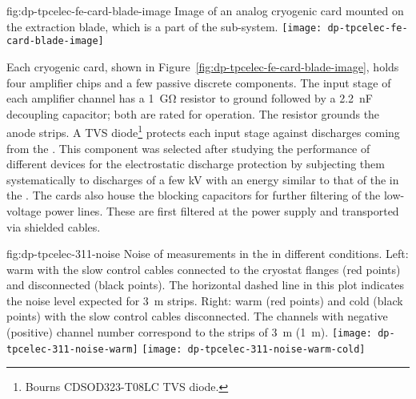 \begin{dunefigure}{fig:dp-tpcelec-fe-card-blade-image}
{Image of an analog cryogenic  card mounted on the extraction blade, which is a part of the  sub-system.}
\texttt{[image: dp-tpcelec-fe-card-blade-image]}
\end{dunefigure}

Each cryogenic  card, shown in Figure~\ref{fig:dp-tpcelec-fe-card-blade-image}, %
holds four  amplifier chips and a few passive discrete components. The input stage of each amplifier channel has a \SI{1}{\giga\ohm} resistor to ground followed by a \SI{2.2}{\nano\farad} decoupling capacitor; both are rated for  operation. The %
resistor grounds the  anode strips. A TVS diode\footnote{Bourns\texttrademark{} CDSOD323-T08LC TVS diode.} protects each input stage against discharges coming from the . This component was selected after studying the performance of different devices for the electrostatic discharge protection by subjecting them systematically to discharges of a few \si{kV} with an energy similar to that of the  in the . The  cards also house the blocking capacitors for further filtering of the low-voltage power lines. These are first filtered at the power supply and transported via shielded cables.

\begin{dunefigure}{fig:dp-tpcelec-311-noise}
{Noise of measurements in the  in different conditions. Left: warm with the slow control cables connected to the cryostat flanges (red points) and disconnected (black points). The horizontal dashed line in this plot indicates the noise level expected for \SI{3}{\meter} strips. Right: warm (red points) and cold (black points) with the slow control cables disconnected. The channels with negative (positive) channel number correspond to the strips of \SI{3}{\meter} (\SI{1}{\meter}).}
\texttt{[image: dp-tpcelec-311-noise-warm]}
\texttt{[image: dp-tpcelec-311-noise-warm-cold]}
\end{dunefigure}

